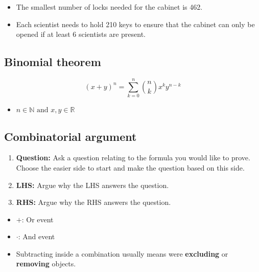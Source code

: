 \begin{example}
        \begin{itemize}
            \item The smallest number of locks needed for the cabinet is 462.
            \item Each scientist needs to hold 210 keys to ensure that the cabinet can only be opened if at least 6 scientists are present.
        \end{itemize}

    \end{example}

\subsection{Binomial theorem}
    \begin{definition}
        \begin{equation}
            (x+y)^n = \sum_{k=0}^{n} \binom{n}{k} x^k y^{n-k}
        \end{equation}
        \begin{itemize}
            \item $n \in \mathbb{N} \text{ and } x,y\in \mathbb{R}$
        \end{itemize}
    \end{definition}

\subsection{Combinatorial argument}
\begin{process}
    \begin{enumerate}
        \item \textbf{Question:} Ask a question relating to the formula you would like to prove. Choose the easier side to start and make the question based on this side.
        \item \textbf{LHS:} Argue why the LHS answers the question.
        \item \textbf{RHS:} Argue why the RHS answers the question.
    \end{enumerate}
\end{process}

\begin{intuition}
    \begin{itemize}
        \item $+$: Or event
        \item $\cdot$: And event
        \item Subtracting inside a combination usually means were \textbf{excluding} or \textbf{removing} objects.
    \end{itemize}
\end{intuition}

